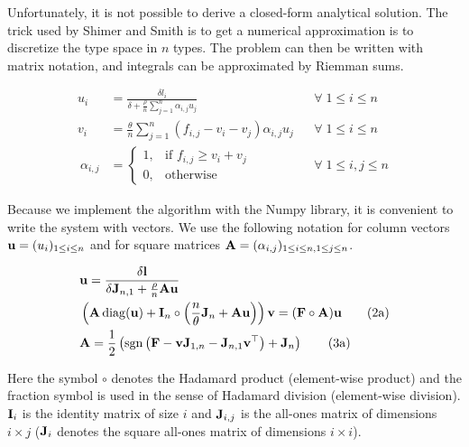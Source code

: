 Unfortunately, it is not possible to derive a closed-form analytical solution. The trick used by Shimer and Smith \citep{shimer_assortative_2000} is to get a numerical approximation is to discretize the type space in $n$ types. The problem can then be written with matrix notation, and integrals can be approximated by Riemman sums.

\begin{align*}[left=\empheqlbrace]
	u_i &= \frac{\delta l_i}{\delta + \frac{\rho}{n} \sum\limits_{j=1}^{n} \alpha_{i,j} u_j} &&\forall \; 1 \leq i \leq n\\
	v_i &= \frac{\theta}{n} \sum_{j=1}^{n} (f_{i,j}-v_i-v_j) \alpha_{i,j} u_j &&\forall \; 1 \leq i \leq n\\\
	\alpha_{i,j} &=
	\begin{cases}
    	1, & \text{if } f_{i,j} \geq v_i+v_j\\
    	0, & \text{otherwise}
	\end{cases}
	&&\forall \; 1 \leq i,j \leq n\
\end{align*}


Because we implement the algorithm with the Numpy library, it is convenient to write the system with vectors. We use the following notation for column vectors $\boldsymbol{\mathbf{u}} = (u_i)_{1 \leq i \leq n}$ and for square matrices $\boldsymbol{\mathbf{A}} = (\alpha_{i,j})_{1 \leq i \leq n, 1 \leq j \leq n}$.





\begin{align}[left=\empheqlbrace]
	&\vect{u} = \frac{\delta \vect{l}}{\delta \vect{J}_{n,1} + \frac{\rho}{n} \vect{A}\vect{u}}\\
	&\left(\vect{A} \diag(\vect{u}) + \vect{I}_n \circ \left(\frac{n}{\theta} \vect{J}_n + \vect{A} \vect{u}\right)\right) \vect{v} = (\vect{F} \circ \vect{A}) \vect{u}
	\tag{2a}\\
	&\vect{A} = \frac{1}{2} \left( \sgn{\left( \vect{F} - \vect{v} \vect{J}_{1,n} - \vect{J}_{n,1} \vect{v}^\top \right)} + \vect{J}_n \right)
	\tag{3a}
\end{align}
 
Here the symbol $\circ$ denotes the Hadamard product (element-wise product) and the fraction symbol is used in the sense of Hadamard division (element-wise division).
$\boldsymbol{\mathbf{I}}_i$ is the identity matrix of size $i$ and $\boldsymbol{\mathbf{J}}_{i,j}$ is the all-ones matrix of dimensions $i \times j$ ($\boldsymbol{\mathbf{J}}_{i}$ denotes the square all-ones matrix of dimensions $i \times i$).


